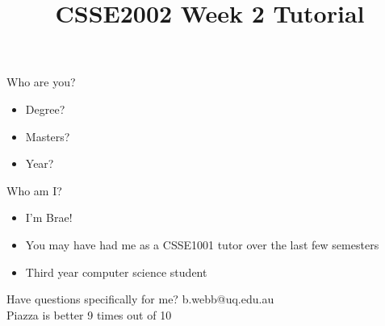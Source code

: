 \documentclass[week2]{csse2002}
\title{CSSE2002 Week 2 Tutorial}
\begin{document}
\begin{frame}
\maketitle
\end{frame}

\begin{topic}{Who are you?}
\begin{itemize}
\item Degree?
\item Masters?
\item Year?
\end{itemize}
\end{topic}

\begin{topic}{Who am I?}
\begin{itemize}
\item I'm Brae!
\item You may have had me as a CSSE1001 tutor over the last few semesters
\item Third year computer science student
\end{itemize}
Have questions specifically for me? b.webb@uq.edu.au\\
Piazza is better 9 times out of 10
\end{topic}
\end{document}

